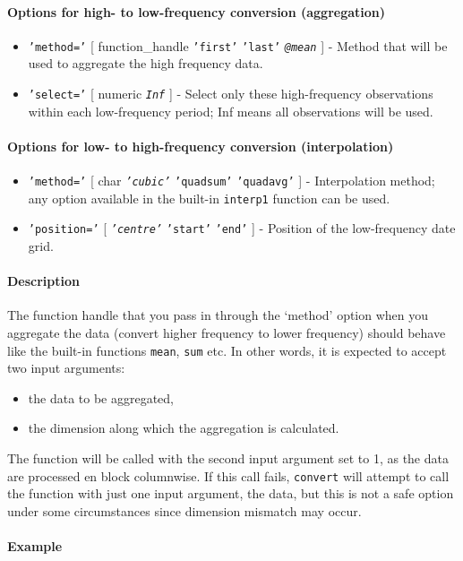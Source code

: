 \paragraph{Options for high- to low-frequency conversion
(aggregation)}

\begin{itemize}
\item
  \texttt{'method='} {[} function\_handle \textbar{} \texttt{'first'}
  \textbar{} \texttt{'last'} \textbar{} \emph{\texttt{@mean}} {]} -
  Method that will be used to aggregate the high frequency data.
\item
  \texttt{'select='} {[} numeric \textbar{} \emph{\texttt{Inf}} {]} -
  Select only these high-frequency observations within each
  low-frequency period; Inf means all observations will be used.
\end{itemize}

\paragraph{Options for low- to high-frequency conversion
(interpolation)}

\begin{itemize}
\item
  \texttt{'method='} {[} char \textbar{} \emph{\texttt{'cubic'}}
  \textbar{} \texttt{'quadsum'} \textbar{} \texttt{'quadavg'} {]} -
  Interpolation method; any option available in the built-in
  \texttt{interp1} function can be used.
\item
  \texttt{'position='} {[} \emph{\texttt{'centre'}} \textbar{}
  \texttt{'start'} \textbar{} \texttt{'end'} {]} - Position of the
  low-frequency date grid.
\end{itemize}

\paragraph{Description}

The function handle that you pass in through the `method' option when
you aggregate the data (convert higher frequency to lower frequency)
should behave like the built-in functions \texttt{mean}, \texttt{sum}
etc. In other words, it is expected to accept two input arguments:

\begin{itemize}
\itemsep1pt\parskip0pt
\item
  the data to be aggregated,
\item
  the dimension along which the aggregation is calculated.
\end{itemize}

The function will be called with the second input argument set to 1, as
the data are processed en block columnwise. If this call fails,
\texttt{convert} will attempt to call the function with just one input
argument, the data, but this is not a safe option under some
circumstances since dimension mismatch may occur.

\paragraph{Example}


